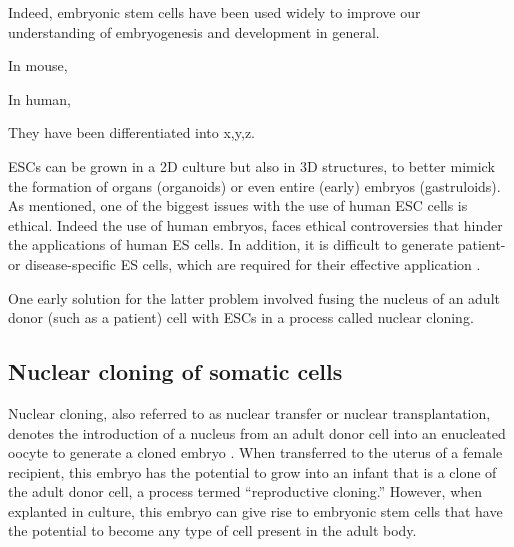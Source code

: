 Indeed, embryonic stem cells have been used widely to improve our understanding of embryogenesis and development in general. 

In mouse, 

In human,

They have been differentiated into x,y,z.

ESCs can be grown in a 2D culture but also in 3D structures, to better mimick the formation of organs (organoids) or even entire (early) embryos (gastruloids).\\





As mentioned, one of the biggest issues with the use of human ESC cells is ethical.
Indeed the use of human embryos, faces ethical controversies that hinder the applications of human ES cells. 
In addition, it is difficult to generate patient- or disease-specific ES cells, which are required for their effective application \cite{yamanaka2007strategies}.

One early solution for the latter problem involved fusing the nucleus of an adult donor (such as a patient) cell with ESCs in a process called nuclear cloning.

\subsection{Nuclear cloning of somatic cells}
\label{sec:cloning} 

Nuclear cloning, also referred to as nuclear transfer or nuclear transplantation, denotes the introduction of a nucleus from an adult donor cell into an enucleated oocyte to generate a cloned embryo \cite{hochedlinger2003nuclear}.
When transferred to the uterus of a female recipient, this embryo has the potential to grow into an infant that is a clone of the adult donor cell, a process termed “reproductive cloning.” 
However, when explanted in culture, this embryo can give rise to embryonic stem cells that have the potential to become any 
type of cell present in the adult body.\\

